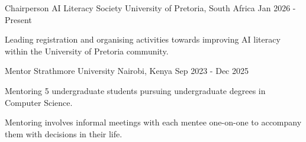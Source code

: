 

\begin{cventries}

  \cventry
    {Chairperson} %
    {AI Literacy Society} %
    {University of Pretoria, South Africa} %
    {Jan 2026 - Present} %
    {
      \begin{cvitems} %
        \item {Leading registration and organising activities towards improving AI literacy within the University of Pretoria community.}
      \end{cvitems}
    }


  \cventry
    {Mentor} %
    {Strathmore University} %
    {Nairobi, Kenya} %
    {Sep 2023 - Dec 2025} %
    {
      \begin{cvitems} %
        \item {Mentoring 5 undergraduate students pursuing undergraduate degrees in Computer Science.}
        \item {Mentoring involves informal meetings with each mentee one-on-one to accompany them with decisions in their life.}
      \end{cvitems}
    }
    
    

\end{cventries}
